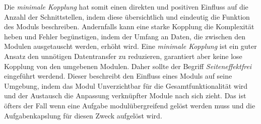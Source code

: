     Die \textit{minimale Kopplung} hat somit einen direkten und positiven Einfluss auf die Anzahl der Schnittstellen, indem diese übersichtlich und eindeutig die Funktion des Moduls beschreiben. 
    Andernfalls kann eine starke Kopplung die Komplexität heben und Fehler begünstigen, indem der Umfang an Daten, die zwischen den Modulen ausgetauscht werden, erhöht wird. 
    Eine \textit{minimale Kopplung} ist ein guter Ansatz den unnötigen Datentransfer zu reduzieren, garantiert aber keine lose Kopplung von den umgebenen Modulen. 
    Daher sollte der Begriff \textit{Seiteneffektfrei} eingeführt werdend. 
    Dieser beschreibt den Einfluss eines Moduls auf seine Umgebung, indem das Modul Unverzichtbar für die Gesamtfunktionalität wird und der Austausch die Anpassung verknüpfter Module nach sich zieht. 
    Das ist öfters der Fall wenn eine Aufgabe modulübergreifend gelöst werden muss und die Aufgabenkapslung für diesen Zweck aufgelöst wird.

